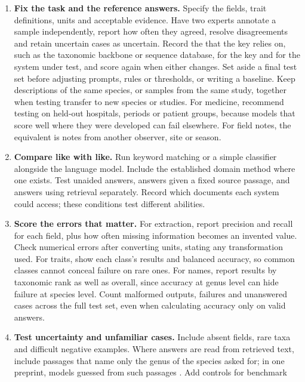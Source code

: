 \begin{enumerate}
  \item \textbf{Fix the task and the reference answers.} Specify the fields,
    trait definitions, units and acceptable evidence. Have two experts annotate
    a sample independently, report how often they agreed, resolve disagreements
    and retain uncertain cases as uncertain. Record the
     that the key relies on, such as the
    taxonomic backbone or sequence database, for the key and for the system
    under test, and score again when either changes. Set aside a final test set
    before adjusting prompts, rules or thresholds, or writing a baseline.
    Keep descriptions of the same species, or samples from the same study,
    together when testing transfer to new species or studies. For medicine,
    \textcite{salaudeen2026failures} recommend testing on held-out hospitals,
    periods or patient groups, because models that score well where they were
    developed can fail elsewhere. For field notes, the equivalent is notes from
    another observer, site or season.
  \item \textbf{Compare like with like.} Run keyword matching or a simple
    classifier alongside the language model. Include the established domain
    method where one exists. Test unaided answers, answers given a fixed source
    passage, and answers using retrieval separately. Record which documents
    each system could access; these conditions test different abilities.
  \item \textbf{Score the errors that matter.} For extraction, report precision
    and recall for each field, plus how often missing information becomes an
    invented value. Check numerical errors after converting units, stating any
    transformation used. For traits, show each class's results and balanced
    accuracy, so common classes cannot conceal failure on rare ones. For names,
    report results by taxonomic rank as well as overall, since accuracy at
    genus level can hide failure at species level.
    Count malformed outputs, failures and unanswered cases across the full test
    set, even when calculating accuracy only on valid answers.
  \item \textbf{Test uncertainty and unfamiliar cases.} Include absent fields,
    rare taxa and difficult negative examples. Where answers are read from
    retrieved text, include passages that name only the genus of the species
    asked for; in one preprint, models guessed from such passages
    \parencite{rayeed2026clade}. Add controls for benchmark

\end{enumerate}

